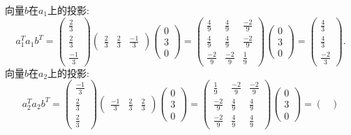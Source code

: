﻿\documentclass{book} \usepackage{exsheets} \usepackage{xeCJK}
\begin{document}
\begin{solution}
  向量$b$在$a_1$上的投影:
$$
a_1^Ta_1b^T=
\begin{pmatrix}
  \frac{2}{3}\\
\frac{2}{3}\\
\frac{-1}{3}
\end{pmatrix}
\begin{pmatrix}
  \frac{2}{3}&\frac{2}{3}&\frac{-1}{3}
\end{pmatrix}
\begin{pmatrix}
  0\\
3\\
0
\end{pmatrix}=
\begin{pmatrix}
  \frac{4}{9}&\frac{4}{9}&\frac{-2}{9}\\
  \frac{4}{9}&\frac{4}{9}&\frac{-2}{9}\\
  \frac{-2}{9}&\frac{-2}{9}&\frac{1}{9}
\end{pmatrix}
\begin{pmatrix}
  0\\
3\\
0
\end{pmatrix}=
\begin{pmatrix}
  \frac{4}{3}\\
\frac{4}{3}\\
\frac{-2}{3}
\end{pmatrix}.
$$
向量$b$在$a_2$上的投影:
$$
a_2^Ta_2b^T=
\begin{pmatrix}
  \frac{-1}{3}\\
\frac{2}{3}\\
\frac{2}{3}
\end{pmatrix}
\begin{pmatrix}
  \frac{-1}{3}&\frac{2}{3}&\frac{2}{3}
\end{pmatrix}
\begin{pmatrix}
  0\\
3\\
0
\end{pmatrix}=
\begin{pmatrix}
  \frac{1}{9}&\frac{-2}{9}&\frac{-2}{9}\\
  \frac{-2}{9}&\frac{4}{9}&\frac{4}{9}\\
  \frac{-2}{9}&\frac{4}{9}&\frac{4}{9}
\end{pmatrix}
\begin{pmatrix}
  0\\
3\\
0
\end{pmatrix}=
\begin{pmatrix}

\end{pmatrix}$$
\end{solution}
\end{document}
